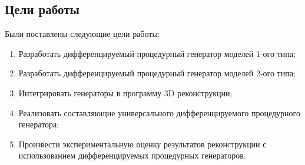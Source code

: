 \documentclass[a4paper,hidelinks,12pt]{article}
\begin{document}
\subsection{Цели работы}
Были поставлены следующие цели работы:
\begin{enumerate}
\item Разработать дифференцируемый процедурный генератор моделей 1-ого типа;
\item Разработать дифференцируемый процедурный генератор моделей 2-ого типа;
\item Интегрировать генераторы в программу 3D реконструкции;
\item Реализовать составляющие универсального дифференцируемого процедурного генератора;
\item Произвести экспериментальную оценку результатов реконструкции с использованием дифференцируемых процедурных генераторов.
\end{enumerate}
\newpage
\end{document}
